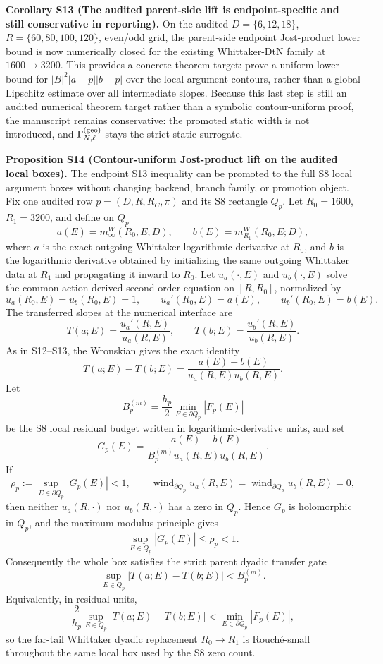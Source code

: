 \documentclass[aps,prd,onecolumn,notitlepage,nofootinbib,superscriptaddress,11pt,floatfix]{revtex4-2}
\begin{document}
\medskip\noindent\textbf{Corollary S13 (The audited parent-side lift is endpoint-specific and still conservative in reporting).}
On the audited \(D=\{6,12,18\}\), \(R=\{60,80,100,120\}\), even/odd grid, the parent-side endpoint Jost-product lower bound is now numerically closed for the existing Whittaker-DtN family at \(1600\to3200\).  This provides a concrete theorem target: prove a uniform lower bound for \(|B|^2|a-p||b-p|\) over the local argument contours, rather than a global Lipschitz estimate over all intermediate slopes.  Because this last step is still an audited numerical theorem target rather than a symbolic contour-uniform proof, the manuscript remains conservative: the promoted static width is not introduced, and \(\Gamma_{N,\ell}^{\rm(geo)}\) stays the strict static surrogate.

\medskip\noindent\textbf{Proposition S14 (Contour-uniform Jost-product lift on the audited local boxes).}
The endpoint S13 inequality can be promoted to the full S8 local argument boxes without changing backend, branch family, or promotion object.  Fix one audited row \(p=(D,R,R_C,\pi)\) and its S8 rectangle \(Q_p\).  Let \(R_0=1600\), \(R_1=3200\), and define on \(Q_p\)
\[
a(E)=m_\infty^{W}(R_0,E;D),
\qquad
b(E)=m_{R_1}^{W}(R_0,E;D),
\]
where \(a\) is the exact outgoing Whittaker logarithmic derivative at \(R_0\), and \(b\) is the logarithmic derivative obtained by initializing the same outgoing Whittaker data at \(R_1\) and propagating it inward to \(R_0\).  Let \(u_a(\cdot,E)\) and \(u_b(\cdot,E)\) solve the common action-derived second-order equation on \([R,R_0]\), normalized by
\[
u_a(R_0,E)=u_b(R_0,E)=1,\qquad
u_a'(R_0,E)=a(E),\qquad
u_b'(R_0,E)=b(E).
\]
The transferred slopes at the numerical interface are
\[
T(a;E)=\frac{u_a'(R,E)}{u_a(R,E)},\qquad
T(b;E)=\frac{u_b'(R,E)}{u_b(R,E)}.
\]
As in S12--S13, the Wronskian gives the exact identity
\[
T(a;E)-T(b;E)
=
\frac{a(E)-b(E)}{u_a(R,E)u_b(R,E)}.
\]
Let
\[
B_p^{(m)}=\frac{h_p}{2}\min_{E\in\partial Q_p}|F_p(E)|
\]
be the S8 local residual budget written in logarithmic-derivative units, and set
\[
G_p(E)=
\frac{a(E)-b(E)}
{B_p^{(m)}u_a(R,E)u_b(R,E)}.
\]
If
\[
\rho_p:=\sup_{E\in\partial Q_p}|G_p(E)|<1,
\qquad
\operatorname{wind}_{\partial Q_p}u_a(R,E)
=
\operatorname{wind}_{\partial Q_p}u_b(R,E)=0,
\]
then neither \(u_a(R,\cdot)\) nor \(u_b(R,\cdot)\) has a zero in \(Q_p\).  Hence \(G_p\) is holomorphic in \(Q_p\), and the maximum-modulus principle gives
\[
\sup_{E\in Q_p}|G_p(E)|\le \rho_p<1.
\]
Consequently the whole box satisfies the strict parent dyadic transfer gate
\[
\sup_{E\in Q_p}|T(a;E)-T(b;E)|
<
B_p^{(m)}.
\]
Equivalently, in residual units,
\[
\frac{2}{h_p}\sup_{E\in Q_p}
\bigl|T(a;E)-T(b;E)\bigr|
<
\min_{E\in\partial Q_p}|F_p(E)|,
\]
so the far-tail Whittaker dyadic replacement \(R_0\to R_1\) is Rouché-small throughout the same local box used by the S8 zero count.
\end{document}
